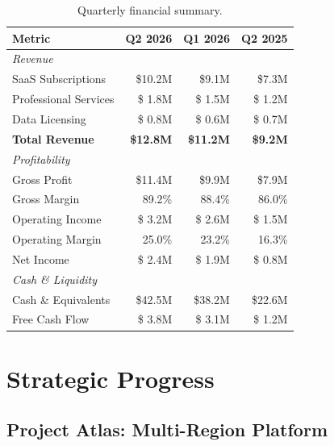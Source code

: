 \documentclass[
    language=english,
    doctype=stakeholder-report,
    institution=none,
]{../../omnilatex}
\begin{document}
\begin{table}[h]
    \centering
    \small
    \begin{tabular}{lrrr}
        \toprule
        \textbf{Metric} & \textbf{Q2 2026} & \textbf{Q1 2026} & \textbf{Q2 2025} \\
        \midrule
        \multicolumn{4}{l}{\textit{Revenue}} \\
        \quad SaaS Subscriptions     & \$10.2M & \$9.1M  & \$7.3M \\
        \quad Professional Services  & \$ 1.8M & \$ 1.5M & \$ 1.2M \\
        \quad Data Licensing         & \$ 0.8M & \$ 0.6M & \$ 0.7M \\
        \midrule
        \textbf{Total Revenue}       & \textbf{\$12.8M} & \textbf{\$11.2M} & \textbf{\$9.2M} \\
        \midrule
        \multicolumn{4}{l}{\textit{Profitability}} \\
        \quad Gross Profit           & \$11.4M & \$9.9M  & \$7.9M \\
        \quad Gross Margin           & 89.2\%  & 88.4\%  & 86.0\% \\
        \quad Operating Income       & \$ 3.2M & \$ 2.6M & \$ 1.5M \\
        \quad Operating Margin       & 25.0\%  & 23.2\%  & 16.3\% \\
        \quad Net Income             & \$ 2.4M & \$ 1.9M & \$ 0.8M \\
        \midrule
        \multicolumn{4}{l}{\textit{Cash \& Liquidity}} \\
        \quad Cash \& Equivalents    & \$42.5M & \$38.2M & \$22.6M \\
        \quad Free Cash Flow         & \$ 3.8M & \$ 3.1M & \$ 1.2M \\
        \bottomrule
    \end{tabular}
    \caption{Quarterly financial summary.}
\end{table}

\section{Strategic Progress}

\subsection{Project Atlas: Multi-Region Platform}
\end{document}
